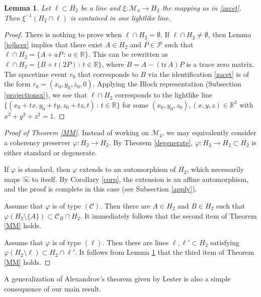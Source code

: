 \documentclass[10pt]{amsart}
\newtheorem{lemma}[theorem]{Lemma}
\theoremstyle{definition}
\theoremstyle{remark}
\numberwithin{subsection}{section}
\numberwithin{equation}{section}
\newcommand\cC{{\mathcal{C}}}
\newcommand\oH{{\overline{H_2}}}
\newcommand\oi{{\widehat{\infty}}}
\begin{document}
\begin{lemma}\label{lll}
Let $\ell\subset \oH$ be a line and $\xi\colon \mathcal{M}_4 \to H_2$ the mapping as in \eqref{zacet}.
Then $\xi^{-1}(H_2\cap \ell)$ is contained in one lightlike line.
\end{lemma}
\begin{proof}
There is nothing to prove when $\ell\cap H_2=\emptyset$. 
If $\ell\cap H_2\neq\emptyset$, then Lemma \ref{jojhcer} implies that there exist $A\in H_2$ and $P \in \mathcal{P}$ such that
$\ell \cap H_2= \{ A + aP \, : \, a \in \mathbb{R} \}$. 
This can be rewritten as $\ell \cap H_2 = \{ B + t(2P)\, : \, t \in \mathbb{R} \}$, where $B = A - (\mathrm{tr}\, A)P$ is a trace zero matrix. The spacetime event $r_0$ that corresponds to $B$ via the identification \eqref{zacet} is of the form $r_0 = (x_0, y_0, z_0 , 0)$. Applying the Bloch representation (Subsection \ref{projectionsx}), we see that 
$\ell \cap H_2$ corresponds to the lightlike line $\{(x_0+tx, y_0+ty, z_0+tz, t)\,:\, t\in \mathbb{R}\}$ for some $(x_0, y_0, z_0), (x,y,z) \in \mathbb{R}^3$ with $x^2+y^2+z^2=1$.
\end{proof}

\begin{proof}[Proof of Theorem \ref{MM}]
Instead of working on $\mathcal{M}_4$, we may equivalently consider a coherency preserver $\varphi\colon H_2\to H_2$. 
By Theorem \ref{degenerate}, $\varphi\colon H_2\to H_2\subset \oH$ is either standard or degenerate. 

If $\varphi$ is standard, then $\varphi$ extends to an automorphism of $\oH$, which necessarily maps $\oi$ to itself. By Corollary \ref{corp}, the extension is an affine automorphism, and the proof is complete in this case (see Subsection \ref{apply}).

Assume that $\varphi$ is of type $(\mathcal{C})$. 
Then there are $A\in H_2$ and $B\in H_2$ such that $\varphi(H_2\setminus\{A\})\subset \cC_B\cap H_2$. It immediately follows that the second item of Theorem \ref{MM} holds. 

Assume that $\varphi$ is of type $(\ell)$. 
Then there are lines $\ell, \ell'\subset \oH$ satisfying $\varphi(H_2\setminus\ell)\subset H_2\cap\ell'$. 
It follows from Lemma \ref{lll} that the third item of Theorem \ref{MM} holds.
\end{proof}


A generalization of Alexandrov's theorem given by Lester is also a simple consequence of our main result.
\end{document}
